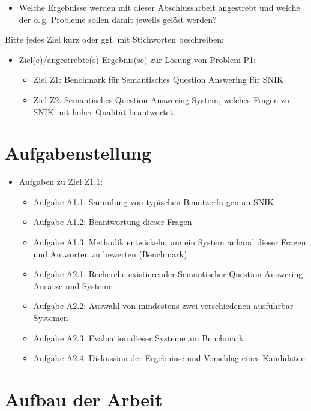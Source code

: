 \begin{itemize}
\item Welche Ergebnisse werden mit dieser Abschlussarbeit angestrebt und welche der o.\,g. Probleme sollen damit jeweils gelöst werden?
\end{itemize}
Bitte jedes Ziel kurz oder ggf. mit Stichworten beschreiben:
\begin{itemize}
\item Ziel(e)/angestrebte(s) Ergebnis(se) zur Lösung von Problem P1:
	\begin{itemize}
	\item Ziel Z1: Benchmark für Semantisches Question Answering für SNIK
	\item Ziel Z2: Semantisches Question Answering System, welches Fragen zu SNIK mit hoher Qualität beantwortet.
	\end{itemize}
\end{itemize}

\section{Aufgabenstellung}

\begin{itemize}
\item Aufgaben zu Ziel Z1.1:
	\begin{itemize}
	\item Aufgabe A1.1: Sammlung von typischen Benutzerfragen an SNIK
	\item Aufgabe A1.2: Beantwortung dieser Fragen
	\item Aufgabe A1.3: Methodik entwickeln, um ein System anhand dieser Fragen und Antworten zu bewerten (Benchmark)
	\item Aufgabe A2.1: Recherche existierender Semantischer Question Answering Ansätze und Systeme
	\item Aufgabe A2.2: Auswahl von mindestens zwei verschiedenen ausführbar Systemen
	\item Aufgabe A2.3: Evaluation dieser Systeme am Benchmark
	\item Aufgabe A2.4: Diskussion der Ergebnisse und Vorschlag eines Kandidaten
	\end{itemize}
\end{itemize}

\section{Aufbau der Arbeit}
